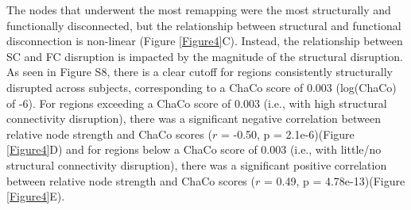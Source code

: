 \documentclass[phd,tocprelim]{cornell}
\begin{document}
	The nodes that underwent the most remapping were the most structurally and functionally disconnected, but the relationship between structural and functional disconnection is non-linear (Figure \ref{Figure4}C). Instead, the relationship between SC and FC disruption is impacted by the magnitude of the structural disruption. As seen in Figure S8, there is a clear cutoff for regions consistently structurally disrupted across subjects, corresponding to a ChaCo score of 0.003 (log(ChaCo) of -6). For regions exceeding a ChaCo score of 0.003 (i.e., with high structural connectivity disruption), there was a significant negative correlation between relative node strength and ChaCo scores ($r$  = -0.50, p = 2.1e-6)(Figure \ref{Figure4}D) and for regions below a ChaCo score of 0.003 (i.e., with little/no structural connectivity disruption), there was a significant positive correlation between relative node strength and ChaCo scores ($r$  = 0.49, p = 4.78e-13)(Figure \ref{Figure4}E). 



    
\end{document}

